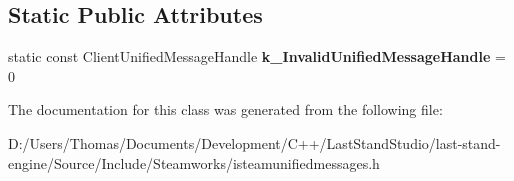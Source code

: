 \subsection*{Static Public Attributes}
\begin{DoxyCompactItemize}
\item 
\hypertarget{classISteamUnifiedMessages_a0d86aa3c7b9cccfc0b08553b893be2d9}{}static const Client\+Unified\+Message\+Handle {\bfseries k\+\_\+\+Invalid\+Unified\+Message\+Handle} = 0\label{classISteamUnifiedMessages_a0d86aa3c7b9cccfc0b08553b893be2d9}

\end{DoxyCompactItemize}


The documentation for this class was generated from the following file\+:\begin{DoxyCompactItemize}
\item 
D\+:/\+Users/\+Thomas/\+Documents/\+Development/\+C++/\+Last\+Stand\+Studio/last-\/stand-\/engine/\+Source/\+Include/\+Steamworks/isteamunifiedmessages.\+h\end{DoxyCompactItemize}
